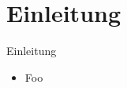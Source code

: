 \section*{Einleitung}

\begin{frame}{Einleitung}
    \begin{itemize}
        \item Foo \cite{eda}
    \end{itemize}
\end{frame}
